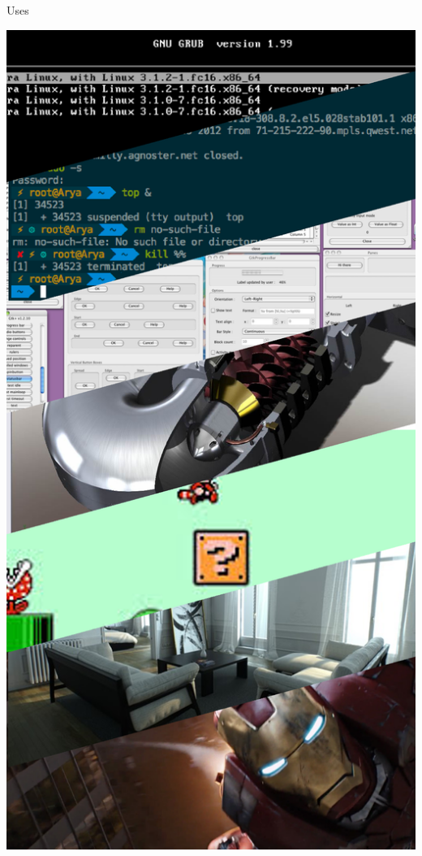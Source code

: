 \documentclass{lug}
\newcommand{\pmidg}[1]{\parbox{\widthof{#1}}{#1}}
\begin{document}
\begin{frame}{Uses}
{        \pmidg{\includegraphics[width=\textwidth]{graphics/uses}}
    }
\end{frame}
\end{document}
